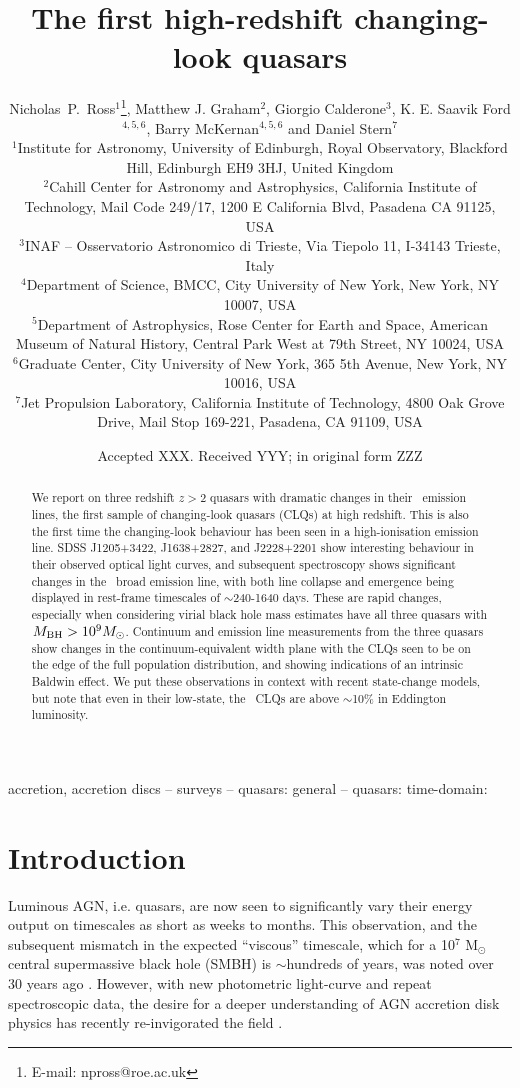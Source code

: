 \documentclass[fleqn,usenatbib]{mnras}
\title[High-redshift CLQs]{The first high-redshift changing-look quasars}
\author[Ross {\it et al.}]
{Nicholas~P.~Ross$^{1}$\thanks{E-mail: npross@roe.ac.uk},
Matthew J. Graham$^{2}$,
Giorgio Calderone$^{3}$, 
K. E. Saavik Ford$^{4,5,6}$,  
\newauthor Barry McKernan$^{4,5,6}$  and Daniel Stern$^{7}$  
\\
$^{1}$Institute for Astronomy, University of Edinburgh, Royal Observatory, Blackford Hill, Edinburgh EH9 3HJ, United Kingdom \\
$^{2}$Cahill Center for Astronomy and Astrophysics, California Institute of Technology, Mail Code 249/17, 1200 E California Blvd, Pasadena CA 91125, USA\\
$^{3}$INAF -- Osservatorio Astronomico di Trieste, Via Tiepolo 11, I-34143 Trieste, Italy \\
$^{4}$Department of Science, BMCC, City University of New York, New York, NY 10007, USA \\
$^{5}$Department of Astrophysics, Rose Center for Earth and Space, American Museum of Natural History, Central Park West at 79th Street, NY 10024, USA \\
$^{6}$Graduate Center, City University of New York, 365 5th Avenue, New York, NY 10016, USA\\
$^{7}$Jet Propulsion Laboratory, California Institute of Technology, 4800 Oak Grove Drive, Mail Stop 169-221, Pasadena, CA 91109, USA \\
}
\date{Accepted XXX. Received YYY; in original form ZZZ}
\begin{document}
\label{firstpage}
\pagerange{\pageref{firstpage}--\pageref{lastpage}}
\maketitle

\begin{abstract}
We report on three redshift $z>2$ quasars with dramatic changes in
their \civ\ emission lines, the first sample of changing-look quasars (CLQs) at
high redshift.  This is also the first time the changing-look
behaviour has been seen in a high-ionisation emission line.  SDSS
J1205+3422, J1638+2827, and J2228+2201 show interesting behaviour in
their observed optical light curves, and subsequent spectroscopy shows
significant changes in the \civ\ broad emission line, with both line
collapse and emergence being displayed in rest-frame timescales of
$\sim$240-1640 days.  These are rapid changes, especially when
considering virial black hole mass estimates have all three quasars
with $M_{\rm BH} > 10^{9} M_{\odot}$.  Continuum and emission line
measurements from the three quasars show changes in the
continuum-equivalent width plane with the CLQs seen to be on the edge
of the full population distribution, and showing indications of an
intrinsic Baldwin effect. We put these observations in context with
recent state-change models, but note that even in their
low-state, the \civ\ CLQs are above $\sim$10\% in Eddington
luminosity.
\end{abstract}

\begin{keywords}
accretion, accretion discs -- surveys -- quasars: general -- quasars: time-domain: 
\end{keywords}


\section{Introduction}
Luminous AGN, i.e. quasars, are now seen to significantly vary their
energy output on timescales as short as weeks to months.  This
observation, and the subsequent mismatch in the expected ``viscous''
timescale, which for a 10$^{7}$ M$_{\odot}$ central supermassive black
hole (SMBH) is $\sim$hundreds of years, was noted over 30 years ago
\citep[e.g.][]{Alloin1985}. However, with new photometric light-curve
and repeat spectroscopic data, the desire for a deeper understanding
of AGN accretion disk physics has recently re-invigorated the field
\citep[e.g.][]{Antonucci2018, Lawrence2018, Ross2018, Stern2018}.
\end{document}
